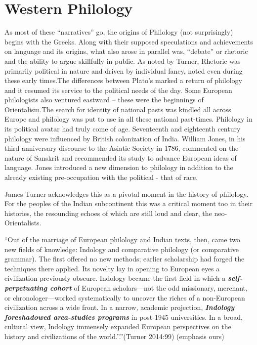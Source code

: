 \section*{Western Philology}

As most of these “narratives” go, the origins of Philology (not surprisingly) begins with the Greeks. Along with their supposed speculations and achievements on language and its origins, what also arose in parallel was, “debate” or rhetoric and the ability to argue skillfully in public. As noted by Turner, Rhetoric was primarily political in nature and driven by individual fancy, noted even during these early times.The differences between Plato’s marked a return of philology and it resumed its service to the political needs of the day. Some European philologists also ventured eastward – these were the beginnings of Orientalism.The search for identity of national pasts was kindled all across Europe and philology was put to use in all these national past-times. Philology in its political avatar had truly come of age. Seventeenth and eighteenth century philology were influenced by British colonization of India. William Jones, in his third anniversary discourse to the Asiatic Society in 1786, commented on the nature of Sanskrit and recommended its study to advance European ideas of language. Jones introduced a new dimension to philology in addition to the already existing pre-occupation with the political - that of race.

James Turner acknowledges this as a pivotal moment in the history of philology. For the peoples of the Indian subcontinent this was a critical moment too in their histories, the resounding echoes of which are still loud and clear, the neo-Orientalists.

\begin{myquote}
“Out of the marriage of European philology and Indian texts, then, came two new fields of knowledge: Indology and comparative philology (or comparative grammar). The first offered no new methods; earlier scholarship had forged the techniques there applied. Its novelty lay in opening to European eyes a civilization previously obscure. Indology became the first field in which a \textbf{\textit{self-perpetuating cohort}} of European scholars—not the odd missionary, merchant, or chronologer—worked systematically to uncover the riches of a non-European civilization across a wide front. In a narrow, academic projection, \textbf{\textit{Indology foreshadowed area-studies programs}} in post-1945 universities. In a broad, cultural view, Indology immensely expanded European perspectives on the history and civilizations of the world.”.”\hfill (Turner 2014:99) (emphasis ours)
\end{myquote}

